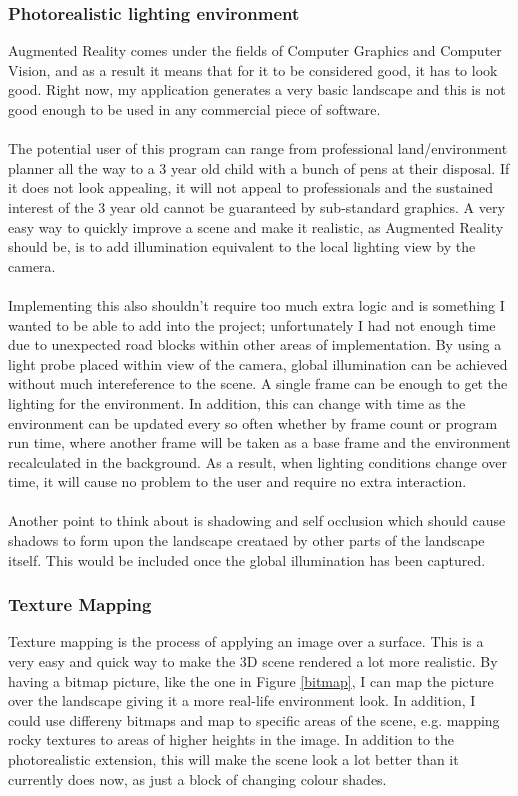 \documentclass[11pt]{article}
\begin{document}
\subsubsection{Photorealistic lighting environment}
Augmented Reality comes under the fields of Computer Graphics and Computer
Vision, and as a result it means that for it to be considered good, 
it has to look good. Right now, my application generates a very basic 
landscape and this is not good enough to be used in any commercial piece
of software.\\
\\
The potential user of this program can range from professional land/environment
planner all the way to a 3 year old child with a bunch of pens at their 
disposal. If it does not look appealing, it will not appeal to 
professionals and the sustained interest of the 3 year old cannot be 
guaranteed by sub-standard graphics. A very easy way to quickly improve 
a scene and make it realistic, as Augmented Reality should be, is to add 
illumination equivalent to the local lighting view by the camera. \\
\\
Implementing this also shouldn't require too much extra logic and is something
I wanted to be able to add into the project; unfortunately I had not
enough time due to unexpected road blocks within other areas of implementation.
By using a light probe placed within view of the camera, global illumination
can be achieved without much intereference to the scene. A single frame can be
enough to get the lighting for the environment. In addition, this can change 
with time as the environment can be updated every so often whether by frame count
or program run time, where another frame will be taken as a base frame 
and the environment  recalculated in the background. As a result, when 
lighting conditions change over time, it will cause no problem to the user 
and require no extra interaction.\\
\\
Another point to think about is shadowing and self occlusion which should 
cause shadows to form upon the landscape creataed by other parts of the landscape
itself. This would be included once the global illumination has been captured.

\subsubsection{Texture Mapping}
Texture mapping is the process of applying an image over a surface. This is
a very easy and quick way to make the 3D scene rendered a lot more realistic.
By having a bitmap picture, like the one in Figure \ref{bitmap}, I can
map the picture over the landscape giving it a more real-life environment
look. In addition, I could use differeny bitmaps and map to specific
areas of the scene, e.g. mapping rocky textures to areas of higher heights
in the image. In addition to the photorealistic extension, this will
make the scene look a lot better than it currently does now, as just a block
of changing colour shades.
\end{document}
